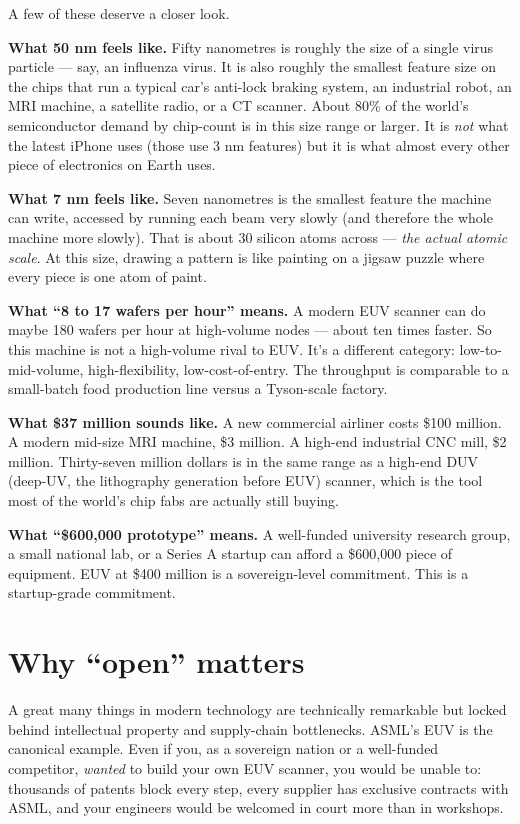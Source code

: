 \documentclass[11pt,letterpaper]{article}
\begin{document}
A few of these deserve a closer look.

\textbf{What 50 nm feels like.} Fifty nanometres is roughly the size of a single virus particle --- say, an influenza virus. It is also roughly the smallest feature size on the chips that run a typical car's anti-lock braking system, an industrial robot, an MRI machine, a satellite radio, or a CT scanner. About 80\% of the world's semiconductor demand by chip-count is in this size range or larger. It is \emph{not} what the latest iPhone uses (those use 3 nm features) but it is what almost every other piece of electronics on Earth uses.

\textbf{What 7 nm feels like.} Seven nanometres is the smallest feature the machine can write, accessed by running each beam very slowly (and therefore the whole machine more slowly). That is about 30 silicon atoms across --- \emph{the actual atomic scale}. At this size, drawing a pattern is like painting on a jigsaw puzzle where every piece is one atom of paint.

\textbf{What ``8 to 17 wafers per hour'' means.} A modern EUV scanner can do maybe 180 wafers per hour at high-volume nodes --- about ten times faster. So this machine is not a high-volume rival to EUV. It's a different category: low-to-mid-volume, high-flexibility, low-cost-of-entry. The throughput is comparable to a small-batch food production line versus a Tyson-scale factory.

\textbf{What \$37 million sounds like.} A new commercial airliner costs \$100 million. A modern mid-size MRI machine, \$3 million. A high-end industrial CNC mill, \$2 million. Thirty-seven million dollars is in the same range as a high-end DUV (deep-UV, the lithography generation before EUV) scanner, which is the tool most of the world's chip fabs are actually still buying.

\textbf{What ``\$600{,}000 prototype'' means.} A well-funded university research group, a small national lab, or a Series A startup can afford a \$600{,}000 piece of equipment. EUV at \$400 million is a sovereign-level commitment. This is a startup-grade commitment.

\section{Why ``open'' matters}

A great many things in modern technology are technically remarkable but locked behind intellectual property and supply-chain bottlenecks. ASML's EUV is the canonical example. Even if you, as a sovereign nation or a well-funded competitor, \emph{wanted} to build your own EUV scanner, you would be unable to: thousands of patents block every step, every supplier has exclusive contracts with ASML, and your engineers would be welcomed in court more than in workshops.
\end{document}
